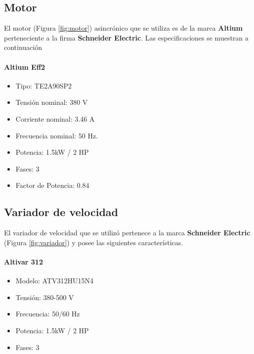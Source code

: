 \subsection{Motor}


El motor (Figura \ref{fig:motor}) asincrónico que se utiliza es de la marca \textbf{Altium} perteneciente a la firma \textbf{Schneider Electric}. Las especificaciones se muestran a continuación \\
\paragraph*{Altium Eff2}

\begin{minipage}[t]{.5\textwidth}
	\begin{itemize}
		\item Tipo: TE2A90SP2
		\item Tensión nominal: 380 V
		\item Corriente nominal: 3.46 A
		\item Frecuencia nominal:  50 Hz.
		\item Potencia: 1.5kW / 2 HP
		\item Fases: 3
		\item Factor de Potencia: 0.84
	\end{itemize}
\end{minipage}
\begin{minipage}[t]{.5\textwidth}
	\centering{}
	\label{fig:motor}

\end{minipage}

\subsection{Variador de velocidad}



El variador de velocidad que se utilizó pertenece a la marca \textbf{Schneider Electric} (Figura \ref{fig:variador}) y posee las siguientes características.
\paragraph*{Altivar 312}
\begin{minipage}[t]{.5\textwidth}
	\begin{itemize}
		\item 	Modelo: ATV312HU15N4
		\item   Tensión: 380-500 V
		\item 	Frecuencia: 50/60 Hz
		\item 	Potencia: 1.5kW / 2 HP
		\item 	Fases: 3
	\end{itemize}
\end{minipage}
\begin{minipage}[t]{.5\textwidth}
	\centering{}
	\label{fig:variador}
\end{minipage}


